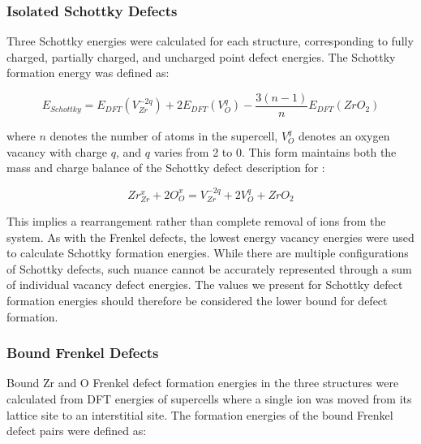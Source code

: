 \subsubsection*{Isolated Schottky Defects}

Three Schottky energies were calculated for each structure, corresponding to fully charged, partially charged, and uncharged point defect energies. The Schottky formation energy was defined as:

\begin{equation}
\label{equation_schottky}
E_{Schottky} = E_{DFT}(V^{-2q}_{Zr}) + 2E_{DFT}(V^{q}_{O}) -\frac{3(n-1)}{n}E_{DFT}(ZrO_2)%
\end{equation}

where $n$ denotes the number of atoms in the supercell, $V^{q}_{O}$ denotes an oxygen vacancy with charge $q$, and $q$ varies from 2 to 0. This form maintains both the mass and charge balance of the Schottky defect description for \zirconia :

\begin{equation}
\label{generic_schottky}
Zr^{x}_{Zr} + 2O^{x}_{O} = V^{-2q}_{Zr} + 2V^{q}_{O} + ZrO_{2}
\end{equation}

This implies a rearrangement rather than complete removal of ions from the system. As with the Frenkel defects, the lowest energy vacancy energies were used to calculate Schottky formation energies. While there are multiple configurations of Schottky defects, such nuance cannot be accurately represented through a sum of individual vacancy defect energies. The values we present for Schottky defect formation energies should therefore be considered the lower bound for defect formation. 

\subsubsection*{Bound Frenkel Defects}

Bound Zr and O Frenkel defect formation energies in the three structures were calculated from DFT energies of supercells where a single ion was moved from its lattice site to an interstitial site. The formation energies of the bound Frenkel defect pairs were defined as:

